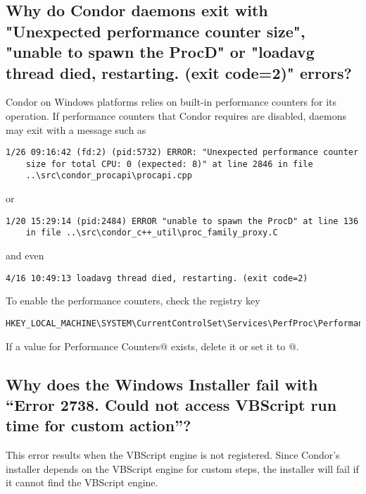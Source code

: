 \subsection*{Why do Condor daemons exit with "Unexpected performance counter size", "unable to spawn the ProcD" or "loadavg thread died, restarting. (exit code=2)" errors?}

Condor on Windows platforms relies on built-in performance counters
for its operation. 
If performance counters that Condor requires are disabled,
daemons may exit with a message such as

\footnotesize
\begin{verbatim}
1/26 09:16:42 (fd:2) (pid:5732) ERROR: "Unexpected performance counter
    size for total CPU: 0 (expected: 8)" at line 2846 in file
    ..\src\condor_procapi\procapi.cpp
\end{verbatim}
\normalsize

or

\footnotesize
\begin{verbatim}
1/20 15:29:14 (pid:2484) ERROR "unable to spawn the ProcD" at line 136
    in file ..\src\condor_c++_util\proc_family_proxy.C
\end{verbatim}
\normalsize

and even

\footnotesize
\begin{verbatim}
4/16 10:49:13 loadavg thread died, restarting. (exit code=2)
\end{verbatim}
\normalsize

To enable the performance counters, check the registry key
\footnotesize
\begin{verbatim}
HKEY_LOCAL_MACHINE\SYSTEM\CurrentControlSet\Services\PerfProc\Performance
\end{verbatim}
\normalsize
If a value for \verb@Disable Performance Counters@ exists, delete it or set
it to @.

\subsection*{Why does the Windows Installer fail with ``Error 2738. Could not access VBScript run time for custom action''?}

This error results when the VBScript engine is not registered.
Since Condor's installer depends on the VBScript engine for custom steps,
the installer will fail if it cannot find the VBScript engine.

